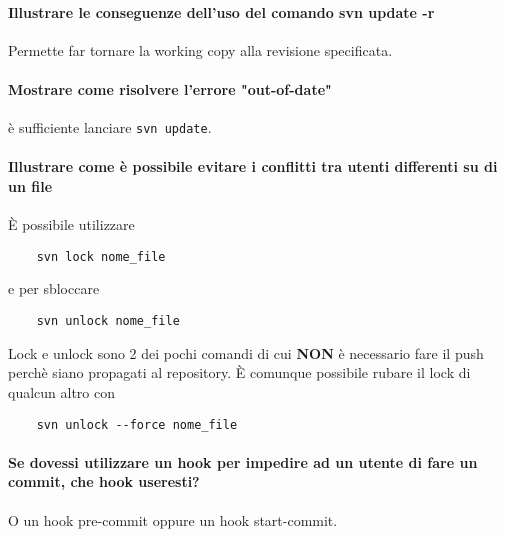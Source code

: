 \documentclass[a4paper]{article}
\begin{document}
	\paragraph{Illustrare le conseguenze dell'uso del comando svn update -r}
	Permette far tornare la working copy alla revisione specificata.

	\paragraph{Mostrare come risolvere l'errore "out-of-date"} è sufficiente lanciare \verb|svn update|.

	\paragraph{Illustrare come è possibile evitare i conflitti tra utenti differenti su di un file}
	È possibile utilizzare
	\begin{verbatim}
	svn lock nome_file
	\end{verbatim}
	e per sbloccare 
	\begin{verbatim}
	svn unlock nome_file
	\end{verbatim}
	Lock e unlock sono 2 dei pochi comandi di cui \textbf{NON} è necessario fare il push perchè siano propagati al repository.
	È comunque possibile rubare il lock di qualcun altro con
	\begin{verbatim}
	svn unlock --force nome_file
	\end{verbatim}

	\paragraph{Se dovessi utilizzare un hook per impedire ad un utente di fare un commit, che hook useresti?} O un hook pre-commit oppure un hook start-commit.
\end{document}
